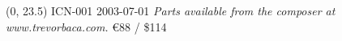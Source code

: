 \documentclass[10pt]{article}
\begin{document}
\begin{textblock}{23}(0, 23.5)
ICN-001 2003-07-01
\hfill \textit{Parts available from the composer at www.trevorbaca.com.}
\hfill \euro 88 / \$114
\end{textblock}
\end{document}
